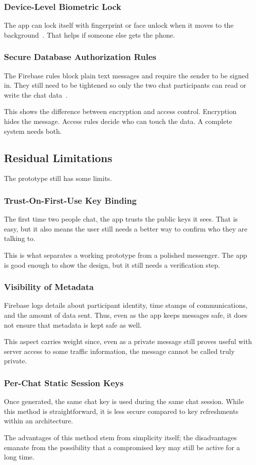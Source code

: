 \subsubsection{Device-Level Biometric Lock}
The app can lock itself with fingerprint or face unlock when it moves to the background~\cite{pq3}. That helps if someone else gets the phone.

\subsubsection{Secure Database Authorization Rules}
The Firebase rules block plain text messages and require the sender to be signed in. They still need to be tightened so only the two chat participants can read or write the chat data~\cite{dolev_yao}.

This shows the difference between encryption and access control. Encryption hides the message. Access rules decide who can touch the data. A complete system needs both.

\subsection{Residual Limitations}
The prototype still has some limits.

\subsubsection{Trust-On-First-Use Key Binding}
The first time two people chat, the app trusts the public keys it sees. That is easy, but it also means the user still needs a better way to confirm who they are talking to.

This is what separates a working prototype from a polished messenger. The app is good enough to show the design, but it still needs a verification step.
\subsubsection{Visibility of Metadata}
Firebase logs details about participant identity, time stamps of communications, and the amount of data sent. Thus, even as the app keeps messages safe, it does not ensure that metadata is kept safe as well.

This aspect carries weight since, even as a private message still proves useful with server access to some traffic information, the message cannot be called truly private.

\subsubsection{Per-Chat Static Session Keys}
Once generated, the same chat key is used during the same chat session. While this method is straightforward, it is less secure compared to key refreshments within an architecture.

The advantages of this method stem from simplicity itself; the disadvantages emanate from the possibility that a compromised key may still be active for a long time.